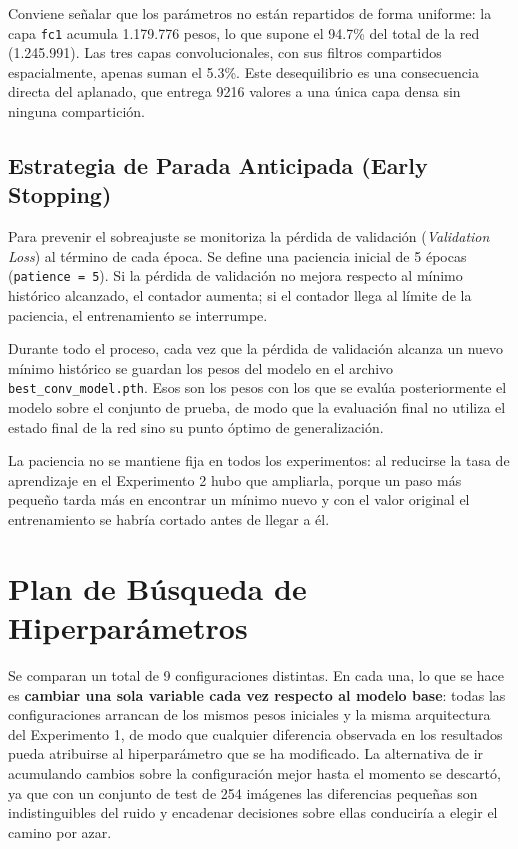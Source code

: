 \documentclass[11pt, a4paper]{article}
\begin{document}
Conviene señalar que los parámetros no están repartidos de forma uniforme: la capa \texttt{fc1} acumula 1.179.776 pesos, lo que supone el 94.7\% del total de la red (1.245.991). Las tres capas convolucionales, con sus filtros compartidos espacialmente, apenas suman el 5.3\%. Este desequilibrio es una consecuencia directa del aplanado, que entrega 9216 valores a una única capa densa sin ninguna compartición.

\subsection{Estrategia de Parada Anticipada (Early Stopping)}
Para prevenir el sobreajuste se monitoriza la pérdida de validación (\textit{Validation Loss}) al término de cada época. Se define una paciencia inicial de 5 épocas (\texttt{patience = 5}). Si la pérdida de validación no mejora respecto al mínimo histórico alcanzado, el contador aumenta; si el contador llega al límite de la paciencia, el entrenamiento se interrumpe.

Durante todo el proceso, cada vez que la pérdida de validación alcanza un nuevo mínimo histórico se guardan los pesos del modelo en el archivo \texttt{best\_conv\_model.pth}. Esos son los pesos con los que se evalúa posteriormente el modelo sobre el conjunto de prueba, de modo que la evaluación final no utiliza el estado final de la red sino su punto óptimo de generalización.

La paciencia no se mantiene fija en todos los experimentos: al reducirse la tasa de aprendizaje en el Experimento 2 hubo que ampliarla, porque un paso más pequeño tarda más en encontrar un mínimo nuevo y con el valor original el entrenamiento se habría cortado antes de llegar a él.

\section{Plan de Búsqueda de Hiperparámetros}
Se comparan un total de 9 configuraciones distintas. En cada una, lo que se hace es \textbf{cambiar una sola variable cada vez respecto al modelo base}: todas las configuraciones arrancan de los mismos pesos iniciales y la misma arquitectura del Experimento 1, de modo que cualquier diferencia observada en los resultados pueda atribuirse al hiperparámetro que se ha modificado. La alternativa de ir acumulando cambios sobre la configuración mejor hasta el momento se descartó, ya que con un conjunto de test de 254 imágenes las diferencias pequeñas son indistinguibles del ruido y encadenar decisiones sobre ellas conduciría a elegir el camino por azar.
\end{document}
